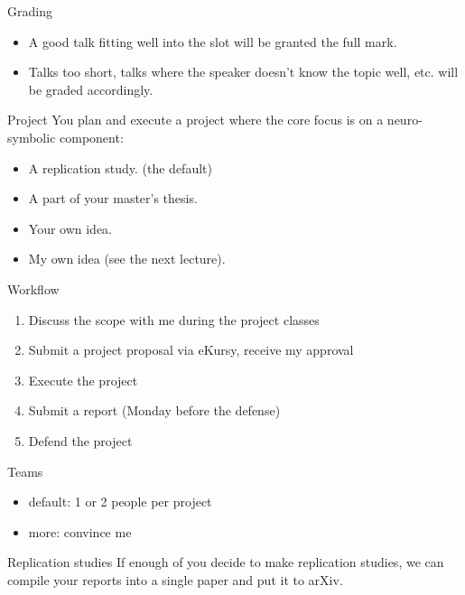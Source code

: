 \documentclass{lecture}
\begin{document}
\begin{frame}{Grading}
    \begin{itemize}
        \item A good talk fitting well into the slot will be granted the full mark. \item Talks too short, talks where the speaker doesn't know the topic well, etc. will be graded accordingly.
    \end{itemize}
\end{frame}

\begin{frame}{Project}
    You plan and execute a project where the core focus is on a neuro-symbolic component:
    \begin{itemize}
        \item A replication study. (the default)
        \item A part of your master's thesis.
        \item Your own idea.        
        \item My own idea (see the next lecture).
    \end{itemize}
\end{frame}

\begin{frame}{Workflow}
    \begin{enumerate}
        \item Discuss the scope with me during the project classes
        \item Submit a project proposal via eKursy, receive my approval
        \item Execute the project
        \item Submit a report (Monday before the defense)
        \item Defend the project
    \end{enumerate}
\end{frame}

\begin{frame}{Teams}
    \begin{itemize}
        \item default: 1 or 2 people per project
        \item more: convince me
    \end{itemize}
\end{frame}

\begin{frame}{Replication studies}
    If enough of you decide to make replication studies, we can compile your reports into a single paper and put it to arXiv.
\end{frame}
\end{document}
